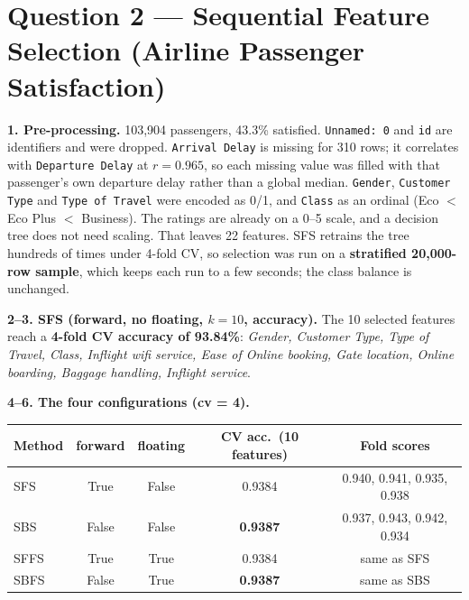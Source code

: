 \documentclass[11pt]{article}
\begin{document}
\section*{Question 2 --- Sequential Feature Selection (Airline Passenger Satisfaction)}

\textbf{1. Pre-processing.} 103{,}904 passengers, 43.3\% satisfied. \texttt{Unnamed: 0} and \texttt{id} are identifiers and were dropped.
\texttt{Arrival Delay} is missing for 310 rows; it correlates with \texttt{Departure Delay} at $r=0.965$, so each missing value was filled with
that passenger's own departure delay rather than a global median. \texttt{Gender}, \texttt{Customer Type} and \texttt{Type of Travel} were encoded as 0/1, and
\texttt{Class} as an ordinal (Eco $<$ Eco Plus $<$ Business). The ratings are already on a 0--5 scale, and a decision tree does not need scaling.
That leaves 22 features. SFS retrains the tree hundreds of times under 4-fold CV, so selection was run on a \textbf{stratified 20{,}000-row sample},
which keeps each run to a few seconds; the class balance is unchanged.

\textbf{2--3. SFS (forward, no floating, $k=10$, accuracy).} The 10 selected features reach a \textbf{4-fold CV accuracy of 93.84\%}:
\emph{Gender, Customer Type, Type of Travel, Class, Inflight wifi service, Ease of Online booking, Gate location, Online boarding,
Baggage handling, Inflight service}.

\textbf{4--6. The four configurations (cv = 4).}
\begin{table}[H]\centering
\begin{tabular}{lcccc}\toprule
Method & forward & floating & CV acc.\ (10 features) & Fold scores\\\midrule
SFS & True & False & 0.9384 & 0.940, 0.941, 0.935, 0.938\\
SBS & False & False & \textbf{0.9387} & 0.937, 0.943, 0.942, 0.934\\
SFFS & True & True & 0.9384 & same as SFS\\
SBFS & False & True & \textbf{0.9387} & same as SBS\\\bottomrule
\end{tabular}
\end{table}
\end{document}
